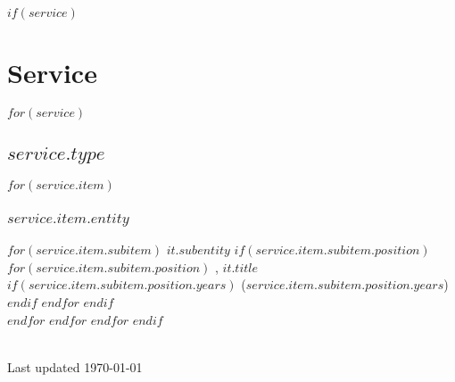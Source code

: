 \documentclass[11pt]{article}
\begin{document}
$if(service)$
  \section{Service}
  $for(service)$
    \subsection{$service.type$}
    $for(service.item)$
      \subsubsection*{$service.item.entity$}
      $for(service.item.subitem)$
      \emph{$it.subentity$}\ignorespaces
        $if(service.item.subitem.position)$
          $for(service.item.subitem.position)$
          {\small, $it.title$}
            $if(service.item.subitem.position.years)$
            {\small($service.item.subitem.position.years$)}\ignorespaces
            $endif$
          $endfor$
        $endif$\\
      $endfor$
    $endfor$
  $endfor$
$endif$

\vfill
\hrulefill\\
\footnotesize{Last updated \today}
\end{document}
